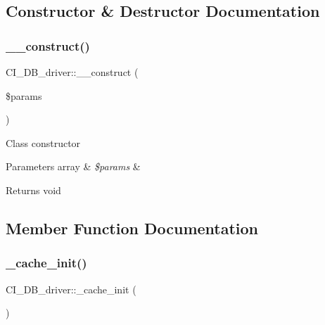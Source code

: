 \subsection{Constructor \& Destructor Documentation}
\mbox{\label{class_c_i___d_b__driver_a4d58a9fa25ca47ad6e38822df3d1aa33}} 
\subsubsection{\texorpdfstring{\+\_\+\+\_\+construct()}{\_\_construct()}}
{\footnotesize\ttfamily C\+I\+\_\+\+D\+B\+\_\+driver\+::\+\_\+\+\_\+construct (\begin{DoxyParamCaption}\item[{}]{\$params }\end{DoxyParamCaption})}

Class constructor


\begin{DoxyParams}[1]{Parameters}
array & {\em \$params} & \\
\hline
\end{DoxyParams}
\begin{DoxyReturn}{Returns}
void 
\end{DoxyReturn}


\subsection{Member Function Documentation}
\mbox{\label{class_c_i___d_b__driver_aa4ceef5421c935dc95ed08afcf7e8eef}} 
\subsubsection{\texorpdfstring{\+\_\+cache\+\_\+init()}{\_cache\_init()}}
{\footnotesize\ttfamily C\+I\+\_\+\+D\+B\+\_\+driver\+::\+\_\+cache\+\_\+init (\begin{DoxyParamCaption}{ }\end{DoxyParamCaption})\hspace{0.3cm}{\ttfamily [protected]}}

